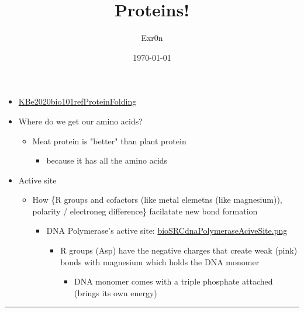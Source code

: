 \documentclass[letterpaper]{article}
\author{Exr0n}
\date{\today}
\title{Proteins!}
\renewcommand{\tableofcontents}{}
\begin{document}
\tableofcontents

\begin{itemize}
\item \href{KBe2020bio101refProteinFolding.org}{KBe2020bio101refProteinFolding}
\item Where do we get our amino acids?

\begin{itemize}
\item Meat protein is "better" than plant protein

\begin{itemize}
\item because it has all the amino acids
\end{itemize}
\end{itemize}

\item Active site

\begin{itemize}
\item How \{R groups and cofactors (like metal elemetns (like magnesium)),
polarity / electroneg difference\} facilatate new bond formation

\begin{itemize}
\item DNA Polymerase's active site:
\href{bioSRCdnaPolymeraseAciveSite.png.org}{bioSRCdnaPolymeraseAciveSite.png}

\begin{itemize}
\item R groups (Asp) have the negative charges that create weak (pink)
bonds with magnesium which holds the DNA monomer

\begin{itemize}
\item DNA monomer comes with a triple phosphate attached (brings its
own energy)
\end{itemize}
\end{itemize}
\end{itemize}
\end{itemize}
\end{itemize}

\noindent\rule{\textwidth}{0.5pt}
\end{document}

